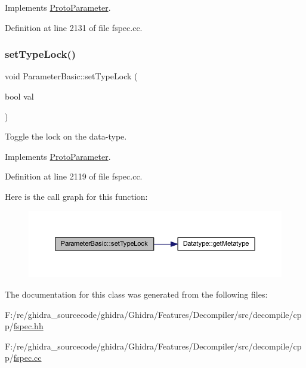 Implements \mbox{\hyperlink{class_proto_parameter_ac444ad9eb331af2d5a72d1f1ef1250ae}{Proto\+Parameter}}.



Definition at line 2131 of file fspec.\+cc.

\mbox{\label{class_parameter_basic_a70625ea5b34cdbe76fab93a029b6eb55}} 
\subsubsection{\texorpdfstring{setTypeLock()}{setTypeLock()}}
{\footnotesize\ttfamily void Parameter\+Basic\+::set\+Type\+Lock (\begin{DoxyParamCaption}\item[{bool}]{val }\end{DoxyParamCaption})\hspace{0.3cm}{\ttfamily [virtual]}}



Toggle the lock on the data-\/type. 



Implements \mbox{\hyperlink{class_proto_parameter_a91f745d13f913e959f724e7259c52fa2}{Proto\+Parameter}}.



Definition at line 2119 of file fspec.\+cc.

Here is the call graph for this function\+:
\nopagebreak
\begin{figure}[H]
\begin{center}
\leavevmode
\includegraphics[width=350pt]{class_parameter_basic_a70625ea5b34cdbe76fab93a029b6eb55_cgraph}
\end{center}
\end{figure}


The documentation for this class was generated from the following files\+:\begin{DoxyCompactItemize}
\item 
F\+:/re/ghidra\+\_\+sourcecode/ghidra/\+Ghidra/\+Features/\+Decompiler/src/decompile/cpp/\mbox{\hyperlink{fspec_8hh}{fspec.\+hh}}\item 
F\+:/re/ghidra\+\_\+sourcecode/ghidra/\+Ghidra/\+Features/\+Decompiler/src/decompile/cpp/\mbox{\hyperlink{fspec_8cc}{fspec.\+cc}}\end{DoxyCompactItemize}
